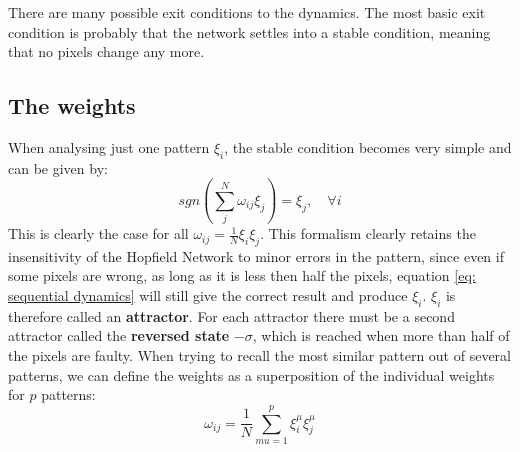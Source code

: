 There are many possible exit conditions to the dynamics. The most basic exit condition is probably that the network settles into a stable condition, meaning that no pixels change any more. 

\subsection{The weights}
When analysing just one pattern $\xi_i$, the stable condition becomes very simple and can be given by:
\begin{equation}
sgn\left( \sum_j^N \omega_{ij} \xi_j \right) = \xi_j, \quad	\forall i
\end{equation}
This is clearly the case for all $\omega_{ij}=\frac{1}{N} \xi_i \xi_j$. This formalism clearly retains the insensitivity of the Hopfield Network to minor errors in the pattern, since even if some pixels are wrong, as long as it is less then half the pixels, equation \ref{eq: sequential dynamics} will still give the correct result and produce $\xi_i$. $\xi_i$ is therefore called an \textbf{attractor}. For each attractor there must be a second attractor called the \textbf{reversed state} $-\sigma$, which is reached when more than half of the pixels are faulty. 
When trying to recall the most similar pattern out of several patterns, we can define the weights as a superposition of the individual weights for $p$ patterns:
\begin{equation}
\omega_{ij}=\frac{1}{N} \sum_{mu=1}^p \xi_i^\mu \xi_j^\mu
\end{equation}

